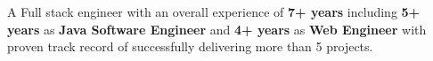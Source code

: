 \documentclass[10pt,a4paper,ragged2e,withhyper]{altacv}
\begin{document}
\begin{paracol}{2}
\begin{itemize}
\end{itemize}











\switchcolumn

A Full stack engineer with an overall experience of \textbf{7+ years} including \textbf{5+ years} as \textbf{Java Software Engineer} and \textbf{4+ years} as \textbf{Web Engineer} with proven track record of successfully delivering more than 5 projects.\\~\\


\end{paracol}
\end{document}
